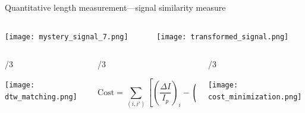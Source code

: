 
\begin{frame}[c]{Quantitative length measurement---signal similarity measure}
	\vspace{-.1in}
	\begin{columns}[t]
	
		\begin{column}[T]{2.25in}
			{\centering
				\texttt{[image: mystery\_signal\_7.png]} \\
				\par
			}
		\end{column}
		
		\begin{column}[T]{2.25in}
			{\centering
				\texttt{[image: transformed\_signal.png]} \\
				\par
			}
		\end{column}

	\end{columns}

	\vspace{.2in}	
	
	\begin{columns}[t]
	
		\begin{column}[T]{\paperwidth/3}
			{\centering
				\texttt{[image: dtw\_matching.png]} \\
				\par
			}
		\end{column}
		
		\begin{column}[T]{\paperwidth/3}
			{\centering
				\vspace{.2in}
				{\scriptsize \[\mathrm{Cost}=\sum_{\left(i,i'\right)}\left[\left(\frac{\Delta I}{I_{p}}\right)_{i}-\left(\frac{\Delta I}{I_{p}}\right)_{i'}\right] \] } \\
				\par
			}
		\end{column}
		
		\begin{column}[T]{\paperwidth/3}
			{\centering
				\texttt{[image: cost\_minimization.png]} \\
				\par
			}
		\end{column}

	\end{columns}
	


\end{frame}





